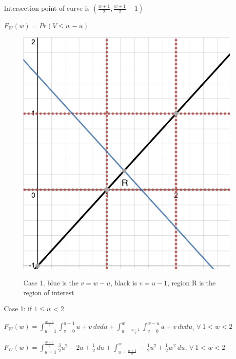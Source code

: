 \documentclass{article} %
\begin{document}
    Intersection point of curve is $(\frac{w+1}{2},\frac{w+1}{2}-1)$

    $F_W(w)=Pr(V \leq w-u)$

    \begin{figure}[h]
        \centering
        \includegraphics[scale=0.25]{HW/HW4/p1c_case1.jpg}
        \label{fig:$F_W$}
        \caption{Case 1, blue is the $v = w-u$, black is $v = u-1$, region R is the region of interest}    
    \end{figure}
    
    Case 1: if $1 \leq w < 2$

    $F_W(w)=\int_{u=1}^{\frac{w+1}{2}}\int_{v=0}^{u-1}u+v \ dvdu + \int_{u=\frac{w+1}{2}}^{w}\int_{v=0}^{w-u}u+v \ dvdu$, $\forall \ 1 < w <2$

    $F_W(w)=\int_{u=1}^{\frac{w+1}{2}}\frac{3}{2}u^2-2u+\frac{1}{2}\ du+\int_{u=\frac{w+1}{2}}^{w}-\frac{1}{2}u^2+\frac{1}{2}w^2\ du$, $\forall \ 1 < w <2$
\end{document}
